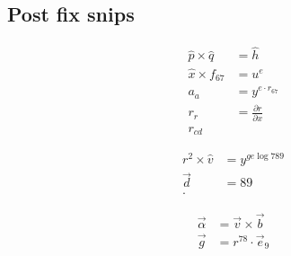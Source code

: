 \documentclass[a4paper]{article}
\begin{document}
\newpage
\subsection{Post fix snips}

\begin{align*}
	\hat{p} \times \hat{q} & = \hat{h}                       \\
	\hat{x} \times  f_{67} & =  u^{e}                        \\
	a_{a}                  & = y^{e \cdot r_{67}}            \\
	r_{r}                  & = \frac{\partial r}{\partial x} \\
	r_{cd}
\end{align*}

\begin{align*}
	r^2 \times \hat{v} & = y^{ge\log{789}} \\
	\vec{d}            & = 89              \\
	.\end{align*}

\begin{align*}
	\vec{\alpha} & = \vec{v} \times \vec{b}   \\
	\vec{g}      & = r^{78} \cdot \vec{e}_{9} \\
\end{align*}
\end{document}
